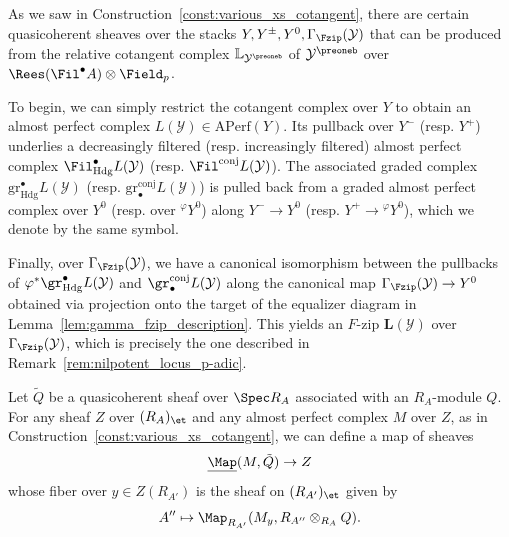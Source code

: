 \documentclass[10pt]{amsart}
\begin{document}
\begin{construction}
\label{const:various_sheaves_on_ys}
As we saw in Construction~\ref{const:various_xs_cotangent}, there are certain quasicoherent sheaves over the stacks $Y,Y^{\pm},Y^0,\Gamma_{\Fzip}(\mathcal{Y})$ that can be produced from the relative cotangent complex $\mathbb{L}_{\mathcal{Y}^\preoneb}$ of $\mathcal{Y}^\preoneb$ over $\Rees(\Fil^\bullet A)\otimes\Field_p$. 

To begin, we can simply restrict the cotangent complex over $Y$ to obtain an almost perfect complex $L(\mathcal{Y})\in \mathrm{APerf}(Y)$. Its pullback over $Y^-$ (resp. $Y^+$) underlies a decreasingly filtered (resp. increasingly filtered) almost perfect complex $\Fil^\bullet_{\mathrm{Hdg}}L(\mathcal{Y})$ (resp. $\Fil^{\mathrm{conj}}L(\mathcal{Y})$). The associated graded complex $\mathrm{gr}^\bullet_{\mathrm{Hdg}}L(\mathcal{Y})$ (resp. $\mathrm{gr}^{\mathrm{conj}}_\bullet L(\mathcal{Y})$) is pulled back from a graded almost perfect complex over $Y^0$ (resp. over ${}^\varphi Y^0$) along $Y^-\to Y^0$ (resp. $Y^+\to {}^\varphi Y^0$), which we denote by the same symbol. 

Finally, over $\Gamma_{\Fzip}(\mathcal{Y})$, we have a canonical isomorphism between the pullbacks of $\varphi^*\gr^\bullet_{\mathrm{Hdg}}L(\mathcal{Y})$ and $\gr^{\mathrm{conj}}_\bullet L(\mathcal{Y})$ along the canonical map $\Gamma_{\Fzip}(\mathcal{Y})\to Y^0$ obtained via projection onto the target of the equalizer diagram in Lemma~\ref{lem:gamma_fzip_description}. This yields an $F$-zip $\bm{L}(\mathcal{Y})$ over $\Gamma_{\Fzip}(\mathcal{Y})$, which is precisely the one described in Remark~\ref{rem:nilpotent_locus_p-adic}.
\end{construction}

\begin{construction}
Let $\tilde{Q}$ be a quasicoherent sheaf over $\Spec R_A$ associated with an $R_A$-module $Q$. For any sheaf $Z$ over $(R_A)_{\et}$ and any almost perfect complex $M$ over $Z$, as in Construction~\ref{const:various_xs_cotangent}, we can define a map of sheaves
\[
\underline{\Map}(M,\tilde{Q})\to Z
\]
whose fiber over $y\in Z(R_{A'})$ is the sheaf on $(R_{A'})_{\et}$ given by
\[
A''\mapsto \Map_{R_{A'}}(M_y,R_{A''}\otimes_{R_A}Q).
\]
\end{construction}
\end{document}
